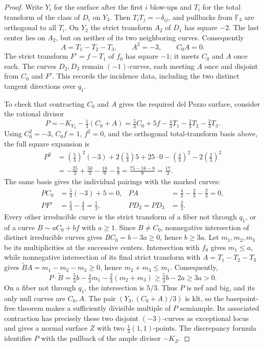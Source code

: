 \documentclass[11pt]{article}
\theoremstyle{plain}
\theoremstyle{definition}
\theoremstyle{remark}
\newcommand{\F}{\mathbb F}
\begin{document}
\begin{proof}
Write \(Y_i\) for the surface after the first \(i\) blow-ups and
\(T_i\) for the total transform of the class of \(D_i\) on \(Y_3\).
Then \(T_iT_j=-\delta_{ij}\), and pullbacks from \(\F_3\) are
orthogonal to all \(T_i\). On \(Y_2\) the strict transform
\(A_2\) of \(D_1\) has square \(-2\). The last center lies on
\(A_2\), but on neither of its two neighboring curves. Consequently
\[
A=T_1-T_2-T_3,\qquad A^2=-3,\qquad C_0A=0.
\]
The strict transform \(F'=f-T_1\) of \(f_0\) has square \(-1\);
it meets \(C_0\) and \(A\) once each. The curves \(D_2,D_3\)
remain \((-1)\)-curves, each meeting \(A\) once and disjoint from
\(C_0\) and \(F'\). This records the incidence data, including the
two distinct tangent directions over \(q_1\).

To check that contracting \(C_0\) and \(A\) gives the required del
Pezzo surface, consider the rational divisor
\[
P=-K_{Y_3}-\tfrac13(C_0+A)
 =\tfrac53 C_0+5f-\tfrac43T_1-\tfrac23T_2-\tfrac23T_3.
\]
Using \(C_0^2=-3\), \(C_0f=1\), \(f^2=0\), and the orthogonal
total-transform basis above, the full square expansion is
\[
\begin{aligned}
P^2
&=\left(\tfrac53\right)^2(-3)
  +2\left(\tfrac53\right)5+25\cdot0
  -\left(\tfrac43\right)^2-2\left(\tfrac23\right)^2\\
&=-\tfrac{25}{3}+\tfrac{50}{3}-\tfrac{16}{9}-\tfrac89
 =\tfrac{75-16-8}{9}=\tfrac{17}{3}.
\end{aligned}
\]
The same basis gives the individual pairings with the marked curves:
\[
\begin{aligned}
PC_0&=\tfrac53(-3)+5=0,
&PA&=\tfrac43-\tfrac23-\tfrac23=0,\\
PF'&=\tfrac53-\tfrac43=\tfrac13,
&PD_2=PD_3&=\tfrac23.
\end{aligned}
\]
Every other irreducible curve is the strict transform of a fiber not
through \(q_1\), or of a curve \(B\sim aC_0+bf\) with
\(a\geq1\). Since \(B\ne C_0\), nonnegative intersection of
distinct irreducible curves gives \(BC_0=b-3a\geq0\), hence
\(b\geq3a\). Let \(m_1,m_2,m_3\) be its multiplicities at the
successive centers.
Intersection with \(f_0\) gives \(m_1\leq a\), while nonnegative
intersection of its final strict transform with
\(A=T_1-T_2-T_3\) gives
\(\widetilde B A=m_1-m_2-m_3\geq0\), hence
\(m_2+m_3\leq m_1\). Consequently,
\[
P\cdot\widetilde B
 =\tfrac53b-\tfrac43m_1-\tfrac23(m_2+m_3)
 \geq\tfrac53b-2a\geq3a>0.
\]
On a fiber not through \(q_1\), the intersection is \(5/3\).
Thus \(P\) is nef and big, and its only null curves are \(C_0,A\).
The pair \((Y_3,(C_0+A)/3)\) is klt, so the basepoint-free theorem
\cite[Section~3.2]{Kollar1998} makes a sufficiently divisible multiple
of \(P\) semiample. Its associated contraction has precisely these
two disjoint \((-3)\)-curves as exceptional locus and gives a normal
surface \(Z\) with two \(\frac13(1,1)\)-points. The discrepancy
formula identifies \(P\) with the pullback of the ample divisor
\(-K_Z\).


\end{proof}
\end{document}
